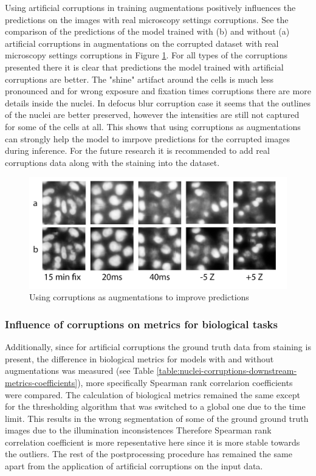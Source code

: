 Using artificial corruptions in training augmentations positively influences the predictions on the images with real microscopy settings corruptions. See the comparison of the predictions of the model trained with (b) and without (a) artificial corruptions in augmentations on the corrupted dataset with real microscopy settings corruptions in Figure \ref{fig:augments-help-real}. For all types of the corruptions presented there it is clear that predictions the model trained with artificial corruptions are better. The "shine" artifact around the cells is much less pronounced and for wrong exposure and fixation times corruptions there are more details inside the nuclei. In defocus blur corruption case it seems that the outlines of the nuclei are better preserved, however the intensities are still not captured for some of the cells at all. This shows that using corruptions as augmentations can strongly help the model to imrpove predictions for the corrupted images during inference. For the future research it is recommended to add real corruptions data along with the staining into the dataset.
\begin{figure}[htb]
	\begin{center}
		\includegraphics[width=0.6\linewidth]{bilder/stability/augments-help-real.png}
		\caption{Using corruptions as augmentations to improve predictions}\label{fig:augments-help-real}
	\end{center}
\end{figure}

\subsubsection{Influence of corruptions on metrics for biological tasks}
Additionally, since for artificial corruptions the ground truth data from staining is present, the difference in biological metrics for models with and without augmentations was measured (see Table \ref{table:nuclei-corruptions-downstream-metrics-coefficients}), more specifically Spearman rank correlarion coefficients were compared. The calculation of biological metrics remained the same except for the thresholding algorithm that was switched to a global one due to the time limit. This results in the wrong segmentation of some of the ground ground truth images due to the illumination inconsistences Therefore Spearman rank correlation coefficient is more repesentative here since it is more stable towards the outliers. The rest of the postprocessing procedure has remained the same apart from the application of artificial corruptions on the input data.

